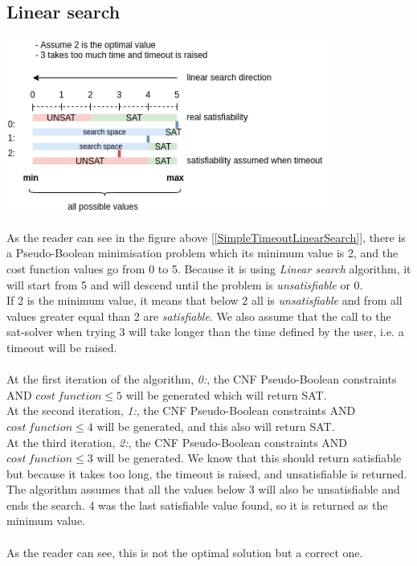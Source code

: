 \subsection{Linear search}
\begin{center}
	\includegraphics[width=0.8\textwidth]{Figures/SimpleTimeoutLinearSearch.png}
	\label{SimpleTimeoutLinearSearch}
\end{center}
As the reader can see in the figure above [\ref{SimpleTimeoutLinearSearch}], there is a Pseudo-Boolean minimisation problem which its minimum value is 2, and the cost function values go from 0 to 5. Because it is using \emph{Linear search} algorithm, it will start from 5 and will descend until the problem is \emph{unsatisfiable} or 0.\\
If 2 is the minimum value, it means that below 2 all is \emph{unsatisfiable} and from all values greater equal than 2 are \emph{satisfiable}. We also assume that the call to the sat-solver when trying 3 will take longer than the time defined by the user, i.e. a timeout will be raised. \\\\
At the first iteration of the algorithm, \emph{0:}, the CNF Pseudo-Boolean constraints AND $cost \ function \leq 5$ will be generated which will return SAT.\\
At the second iteration, \emph{1:}, the CNF Pseudo-Boolean constraints AND $cost \ function \leq 4$ will be generated, and this also will return SAT.\\
At the third iteration, \emph{2:}, the CNF Pseudo-Boolean constraints AND $cost \ function \leq 3$ will be generated. We know that this should return satisfiable but because it takes too long, the timeout is raised, and unsatisfiable is returned. The algorithm assumes that all the values below 3 will also be unsatisfiable and ends the search. 4 was the last satisfiable value found, so it is returned as the minimum value. \\\\
As the reader can see, this is not the optimal solution but a correct one.

